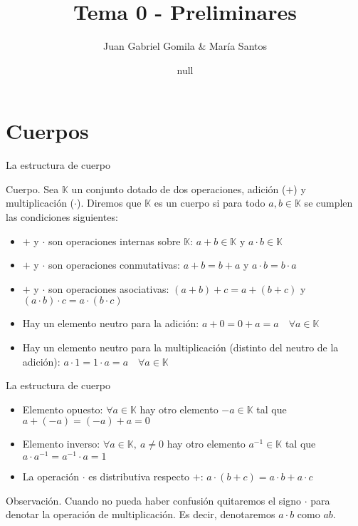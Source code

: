 \documentclass[
  ignorenonframetext,
]{beamer}
\title{Tema 0 - Preliminares}
\author{Juan Gabriel Gomila \& María Santos}
\date{null}
\providecommand{\tightlist}{%
  \setlength{\itemsep}{0pt}\setlength{\parskip}{0pt}}
\begin{document}
\frame{\titlepage}

\hypertarget{cuerpos}{%
\section{Cuerpos}\label{cuerpos}}

\begin{frame}{La estructura de cuerpo}
\protect\hypertarget{la-estructura-de-cuerpo}{}

Cuerpo. Sea \(\mathbb{K}\) un conjunto dotado de dos operaciones,
adición (\(+\)) y multiplicación (\(\cdot\)). Diremos que \(\mathbb{K}\)
es un cuerpo si para todo \(a,b\in\mathbb{K}\) se cumplen las
condiciones siguientes:

\begin{itemize}
\tightlist
\item
  \(+\) y \(\cdot\) son operaciones internas sobre \(\mathbb{K}\):
  \(a+b\in\mathbb{K}\) y \(a\cdot b\in\mathbb{K}\)
\item
  \(+\) y \(\cdot\) son operaciones conmutativas: \(a+b=b+a\) y
  \(a\cdot b=b\cdot a\)
\item
  \(+\) y \(\cdot\) son operaciones asociativas: \((a+b)+c=a+(b+c)\) y
  \((a\cdot b)\cdot c=a\cdot(b\cdot c)\)
\item
  Hay un elemento neutro para la adición:
  \(a+0=0+a=a\quad \forall a\in\mathbb{K}\)
\item
  Hay un elemento neutro para la multiplicación (distinto del neutro de
  la adición): \(a\cdot 1=1\cdot a=a\quad \forall a\in\mathbb{K}\)
\end{itemize}

\end{frame}

\begin{frame}{La estructura de cuerpo}
\protect\hypertarget{la-estructura-de-cuerpo-1}{}

\begin{itemize}
\tightlist
\item
  Elemento opuesto: \(\forall a\in\mathbb{K}\) hay otro elemento
  \(-a\in\mathbb{K}\) tal que \(a+(-a)=(-a)+a=0\)
\item
  Elemento inverso: \(\forall a\in\mathbb{K},\ a\ne 0\) hay otro
  elemento \(a^{-1}\in\mathbb{K}\) tal que
  \(a\cdot a^{-1}=a^{-1}\cdot a=1\)
\item
  La operación \(\cdot\) es distributiva respecto \(+\):
  \(a\cdot(b+c)=a\cdot b+a\cdot c\)
\end{itemize}

Observación. Cuando no pueda haber confusión quitaremos el signo
\(\cdot\) para denotar la operación de multiplicación. Es decir,
denotaremos \(a\cdot b\) como \(ab\).

\end{frame}
\end{document}
